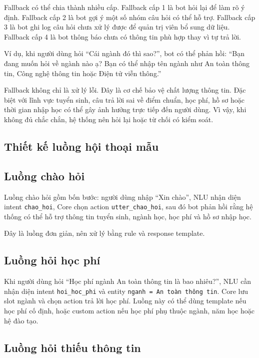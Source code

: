 \documentclass[12pt,a4paper]{report}
\begin{document}
Fallback có thể chia thành nhiều cấp. Fallback cấp 1 là bot hỏi lại để làm rõ ý định. Fallback cấp 2 là bot gợi ý một số nhóm câu hỏi có thể hỗ trợ. Fallback cấp 3 là bot ghi log câu hỏi chưa xử lý được để quản trị viên bổ sung dữ liệu. Fallback cấp 4 là bot thông báo chưa có thông tin phù hợp thay vì tự trả lời.

Ví dụ, khi người dùng hỏi ``Cái ngành đó thì sao?'', bot có thể phản hồi: ``Bạn đang muốn hỏi về ngành nào ạ? Bạn có thể nhập tên ngành như An toàn thông tin, Công nghệ thông tin hoặc Điện tử viễn thông.''

Fallback không chỉ là xử lý lỗi. Đây là cơ chế bảo vệ chất lượng thông tin. Đặc biệt với lĩnh vực tuyển sinh, câu trả lời sai về điểm chuẩn, học phí, hồ sơ hoặc thời gian nhập học có thể gây ảnh hưởng trực tiếp đến người dùng. Vì vậy, khi không đủ chắc chắn, hệ thống nên hỏi lại hoặc từ chối có kiểm soát.

\subsection*{Thiết kế luồng hội thoại mẫu}

\subsection*{Luồng chào hỏi}

Luồng chào hỏi gồm bốn bước: người dùng nhập ``Xin chào'', NLU nhận diện intent \texttt{chao\_hoi}, Core chọn action \texttt{utter\_chao\_hoi}, sau đó bot phản hồi rằng hệ thống có thể hỗ trợ thông tin tuyển sinh, ngành học, học phí và hồ sơ nhập học.

Đây là luồng đơn giản, nên xử lý bằng rule và response template.

\subsection*{Luồng hỏi học phí}

Khi người dùng hỏi ``Học phí ngành An toàn thông tin là bao nhiêu?'', NLU cần nhận diện intent \texttt{hoi\_hoc\_phi} và entity \texttt{nganh = An toàn thông tin}. Core lưu slot ngành và chọn action trả lời học phí. Luồng này có thể dùng template nếu học phí cố định, hoặc custom action nếu học phí phụ thuộc ngành, năm học hoặc hệ đào tạo.

\subsection*{Luồng hỏi thiếu thông tin}
\end{document}
